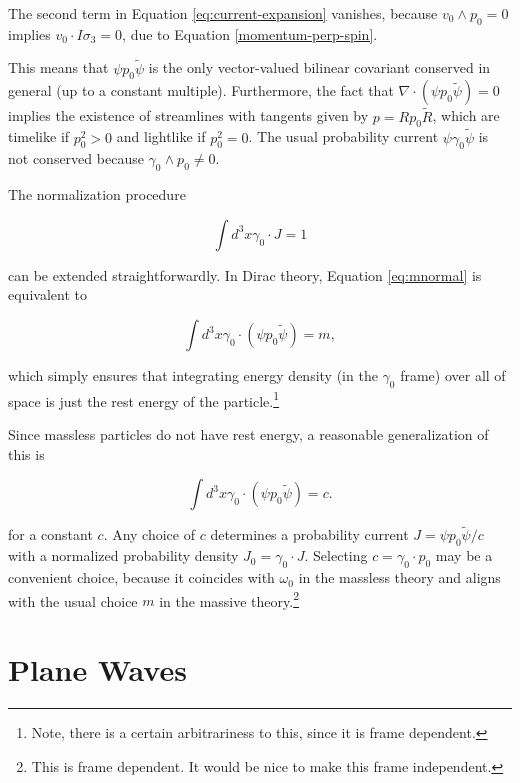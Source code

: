 \documentclass{article}
\begin{document}
  The second term in Equation \ref{eq:current-expansion} vanishes, because $v_0 \wedge p_0 = 0$ implies $v_0 \cdot I \sigma_3 = 0$, due to Equation \ref{momentum-perp-spin}.

  This means that $\psi p_0 \widetilde \psi$ is the only vector-valued bilinear covariant conserved in general (up to a constant multiple). Furthermore, the fact that $\nabla \cdot (\psi p_0 \widetilde \psi) = 0$ implies the existence of streamlines with tangents given by $p = R p_0 \widetilde R$, which are timelike if $p_0^2 > 0$ and lightlike if $p_0^2 = 0$. The usual probability current $\psi \gamma_0 \widetilde \psi$ is not conserved because $\gamma_0 \wedge p_0 \not= 0$.

  The normalization procedure

  \begin{equation}
    \int d^3x \gamma_0 \cdot J = 1\label{eq:mnormal}
  \end{equation}

  can be extended straightforwardly. In Dirac theory, Equation \ref{eq:mnormal} is equivalent to

  \begin{equation}
    \int d^3x \gamma_0 \cdot (\psi p_0 \widetilde \psi) = m,
  \end{equation}

  which simply ensures that integrating energy density (in the $\gamma_0$ frame) over all of space is just the rest energy of the particle.\footnote{Note, there is a certain arbitrariness to this, since it is frame dependent.}

  Since massless particles do not have rest energy, a reasonable generalization of this is

  \begin{equation}
    \int d^3x \gamma_0 \cdot (\psi p_0 \widetilde \psi) = c. \label{eq:normalization}
  \end{equation}

  for a constant $c$. Any choice of $c$ determines a probability current $J = \psi p_0 \widetilde \psi / c$ with a normalized probability density $J_0 = \gamma_0 \cdot J$. Selecting $c = \gamma_0 \cdot p_0$ may be a convenient choice, because it coincides with $\omega_0$ in the massless theory and aligns with the usual choice $m$ in the massive theory.\footnote{This is frame dependent. It would be nice to make this frame independent.}

  \section{Plane Waves} \label{waves}
\end{document}
